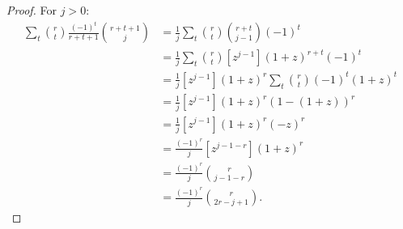 \begin{lemma}
\begin{proof}
        For $j > 0$:
        \begin{align*}
            \sum_t \binom{r}{t} \frac{(-1)^t}{r+t+1} \binom{r+t+1}{j}
            &= \frac{1}{j} \sum_t \binom{r}{t} \binom{r+t}{j-1} (-1)^t \\
            &= \frac{1}{j} \sum_t \binom{r}{t} [z^{j-1}] (1+z)^{r+t} (-1)^t \\
            &= \frac{1}{j} [z^{j-1}] (1+z)^r \sum_t \binom{r}{t} (-1)^t (1+z)^t \\
            &= \frac{1}{j} [z^{j-1}] (1+z)^r \left(1 - (1+z)\right)^r \\
            &= \frac{1}{j} [z^{j-1}] (1+z)^r (-z)^r \\
            &= \frac{(-1)^r}{j} [z^{j-1-r}] (1+z)^r \\
            &= \frac{(-1)^r}{j} \binom{r}{j - 1 - r} \\
            &= \frac{(-1)^r}{j} \binom{r}{2r - j + 1}.
        \end{align*}
    \end{proof}
\end{lemma}

